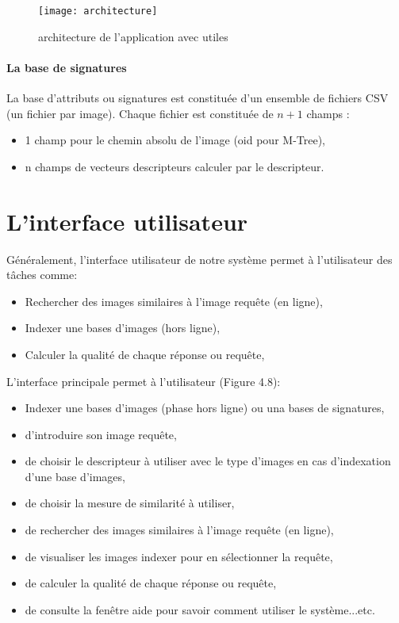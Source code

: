 \begin{figure}[H]
	\centering
	\texttt{[image: architecture]} 
	\caption{architecture de l’application avec utiles}
\end{figure}
\paragraph{La base de signatures}
La base d’attributs ou signatures est constituée d’un ensemble de fichiers CSV (un fichier par image). Chaque fichier est constituée de $ n+1 $ champs :
\begin{itemize}
	\item 1 champ pour le chemin absolu de l'image (oid pour M-Tree),
	\item n champs de vecteurs descripteurs calculer par le descripteur.
\end{itemize}
\section{L’interface utilisateur }
Généralement, l'interface utilisateur de notre système permet à l'utilisateur des tâches comme:
 \begin{itemize}
 	\item Rechercher des images similaires à l'image requête (en ligne),
 	\item Indexer une bases d'images (hors ligne),
 	\item Calculer la qualité de chaque réponse ou requête,
 \end{itemize}

L'interface principale permet à l’utilisateur (Figure 4.8): 
\begin{itemize}
	\item Indexer une bases d'images (phase hors ligne) ou una bases de signatures,
	\item d’introduire son image requête,
	\item de choisir le descripteur à utiliser avec le type d'images en cas d'indexation d'une base d'images,
	\item de choisir la mesure de similarité à utiliser,
	\item de rechercher des images similaires à l'image requête (en ligne),
	\item de visualiser les images indexer pour en sélectionner la requête,
	\item de calculer la qualité de chaque réponse ou requête,
	\item de consulte la fenêtre aide pour savoir comment utiliser le système...etc.
\end{itemize}

